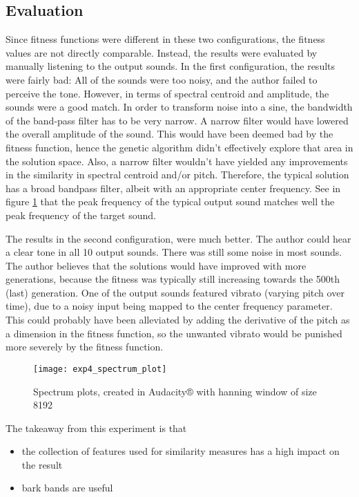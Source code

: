 \subsection{Evaluation}
Since fitness functions were different in these two configurations, the fitness values are not directly comparable. Instead, the results were evaluated by manually listening to the output sounds. In the first configuration, the results were fairly bad: All of the sounds were too noisy, and the author failed to perceive the tone. However, in terms of spectral centroid and amplitude, the sounds were a good match. In order to transform noise into a sine, the bandwidth of the band-pass filter has to be very narrow. A narrow filter would have lowered the overall amplitude of the sound. This would have been deemed bad by the fitness function, hence the genetic algorithm didn't effectively explore that area in the solution space. Also, a narrow filter wouldn't have yielded any improvements in the similarity in spectral centroid and/or pitch. Therefore, the typical solution has a broad bandpass filter, albeit with an appropriate center frequency. See in figure \ref{fig:exp4_spectrum_plot} that the peak frequency of the typical output sound matches well the peak frequency of the target sound.

The results in the second configuration, were much better. The author could hear a clear tone in all 10 output sounds. There was still some noise in most sounds. The author believes that the solutions would have improved with more generations, because the fitness was typically still increasing towards the 500th (last) generation. One of the output sounds featured vibrato (varying pitch over time), due to a noisy input being mapped to the center frequency parameter. This could probably have been alleviated by adding the derivative of the pitch as a dimension in the fitness function, so the unwanted vibrato would be punished more severely by the fitness function.

\begin{figure}[h]
    \centering
    \texttt{[image: exp4\_spectrum\_plot]}
    \caption{Spectrum plots, created in Audacity® with hanning window of size 8192}
    \label{fig:exp4_spectrum_plot}
\end{figure}

The takeaway from this experiment is that
\begin{itemize}  
\item the collection of features used for similarity measures has a high impact on the result
\item bark bands are useful
\end{itemize}

